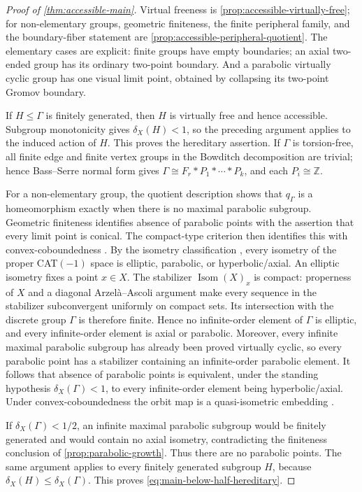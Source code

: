 \documentclass[11pt]{article}
\theoremstyle{definition}
\newcommand{\Isom}{\operatorname{Isom}}
\begin{document}
\begin{proof}[Proof of \cref{thm:accessible-main}]
Virtual freeness is \cref{prop:accessible-virtually-free}; for non-elementary groups,
geometric finiteness, the finite peripheral family, and the boundary-fiber statement are
\cref{prop:accessible-peripheral-quotient}.  The elementary cases are explicit: finite groups
have empty boundaries; an axial two-ended group has its ordinary two-point boundary. And a
parabolic virtually cyclic group has one visual limit point, obtained by collapsing its
two-point Gromov boundary.

If $H\le\Gamma$ is finitely generated, then $H$ is virtually free and hence accessible.
Subgroup monotonicity gives $\delta_X(H)<1$, so the preceding argument applies to the induced
action of $H$.  This proves the hereditary assertion.  If $\Gamma$ is torsion-free, all finite
edge and finite vertex groups in the Bowditch decomposition are trivial; hence Bass--Serre
normal form gives $\Gamma\cong F_r*P_1*\cdots*P_k$, and each $P_i\cong\mathbb Z$.

For a non-elementary group, the quotient description shows that $q_\Gamma$ is a homeomorphism
exactly when there is no maximal parabolic subgroup.  Geometric finiteness identifies absence
of parabolic points with the assertion that every limit point is conical.  The compact-type
criterion then identifies this with convex-coboundedness
\cite[Theorem~12.2.7]{DasSimmonsUrbanski2017}.  By the isometry classification
\cite[Chapter~II.6]{BridsonHaefliger1999}, every isometry of the proper CAT$(-1)$ space is
elliptic, parabolic, or hyperbolic/axial.  An elliptic isometry fixes a point $x\in X$.  The
stabilizer $\Isom(X)_x$ is compact: properness of $X$ and a diagonal Arzel\`a--Ascoli argument
make every sequence in the stabilizer subconvergent uniformly on compact sets.  Its
intersection with the discrete group $\Gamma$ is therefore finite.  Hence no infinite-order
element of $\Gamma$ is elliptic, and every infinite-order element is axial or parabolic.
Moreover, every infinite maximal parabolic subgroup has already been proved virtually cyclic,
so every
parabolic point has a stabilizer containing an infinite-order parabolic element.  It follows
that absence of parabolic points is equivalent, under the standing hypothesis $\delta_X(\Gamma)<1$, to every
infinite-order element being hyperbolic/axial.  Under convex-coboundedness
the orbit map is a quasi-isometric embedding
\cite[Theorem~12.2.12]{DasSimmonsUrbanski2017}.

If $\delta_X(\Gamma)<1/2$, an infinite maximal parabolic subgroup would be finitely generated
and would contain no axial isometry, contradicting the finiteness conclusion of
\cref{prop:parabolic-growth}.  Thus there are no parabolic points.  The same argument applies
to every finitely generated subgroup $H$, because $\delta_X(H)\le\delta_X(\Gamma)$.  This
proves \eqref{eq:main-below-half-hereditary}.
\end{proof}
\end{document}
